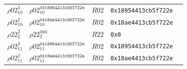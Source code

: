 \begin{longtable}[c]{|l|l|l|l|l|}
  $\rho02_{10}^{3}$ & $\rho02_{10}^{\texttt{0x18954413cb5f722e}}$ & $R02$ &
  \texttt{0x18954413cb5f722e} \\
  $\rho02_{10}^{2}$ & $\rho02_{10}^{\texttt{0x18ae4413cb5f722e}}$ & $R02$ &
  \texttt{0x18ae4413cb5f722e} \\
  $\rho22_{2}^{2}$ & $\rho22_{2}^{\texttt{0x0}}$ & $R22$ & \texttt{0x0} \\
  $\rho02_{11}^{3}$ & $\rho02_{11}^{\texttt{0x18954413cb5f722e}}$ & $R02$ &
  \texttt{0x18954413cb5f722e} \\
  $\rho02_{11}^{2}$ & $\rho02_{11}^{\texttt{0x18ae4413cb5f722e}}$ & $R02$ &
  \texttt{0x18ae4413cb5f722e} \\
\end{longtable}
\normalsize%
\endgroup
